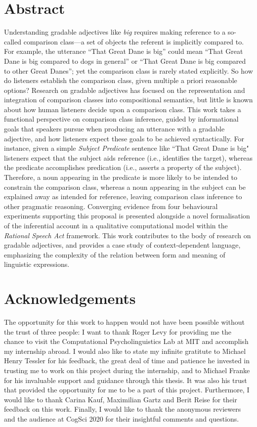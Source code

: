 \documentclass[12pt, twoside, openright]{report}
\begin{document}


\chapter*{Abstract}
Understanding gradable adjectives like \emph{big} requires making reference to a so-called comparison class---a set of objects the referent is implicitly compared to. For example, the utterance “That Great Dane is big” could mean “That Great Dane is big compared to dogs in general” or “That Great Dane is big compared to other Great Danes”; yet the comparison class is rarely stated explicitly. So how do listeners establish the comparison class, given multiple a priori reasonable options?
Research on gradable adjectives has focused on the representation and integration of comparison classes into compositional semantics, but little is known about how human listeners decide upon a comparison class. 
This work takes a functional perspective on comparison class inference, guided by informational goals that speakers pursue when producing an utterance with a gradable adjective, and how listeners expect these goals to be achieved syntactically. For instance, given a simple \textit{Subject Predicate} sentence like ``That Great Dane is big" listeners expect that the subject aids reference (i.e., identifies the target), whereas the predicate accomplishes predication (i.e., asserts a property of the subject). Therefore, a noun appearing in the predicate is more likely to be intended to constrain the comparison class, whereas a noun appearing in the subject can be explained away as intended for reference, leaving comparison class inference to other pragmatic reasoning. 
Converging evidence from four behavioural experiments supporting this proposal is presented alongside a novel formalisation of the inferential account in a qualitative computational model within the \textit{Rational Speech Act} framework. This work contributes to the body of research on gradable adjectives, and provides a case study of  context-dependent language, emphasizing the complexity of the relation between form and meaning of linguistic expressions. 


\chapter*{Acknowledgements}

The opportunity for this work to happen would not have been possible without the trust of three people: I want to thank Roger Levy for providing me the chance to visit the Computational Psycholinguistics Lab at MIT and accomplish my internship abroad. I would also like to state my infinite gratitute to Michael Henry Tessler for his feedback, the great deal of time and patience he invested in trusting me to work on this project during the internship, and to Michael Franke for his invaluable support and guidance through this thesis. It was also his trust that provided the opportunity for me to be a part of this project. Furthermore, I would like to thank Carina Kauf, Maximilian Gartz and Berit Reise for their feedback on this work. Finally, I would like to thank the anonymous reviewers and the audience at CogSci 2020 for their insightful comments and questions. 
\end{document}
